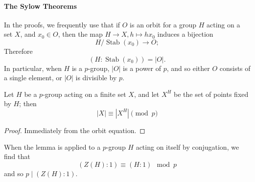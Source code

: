 \paragraph{The Sylow Theorems}

In the proofs, we frequently use that if \( O \) is an orbit for a group \( H \) acting on a set \( X \), and \( x_0 \in O \), then the map \( H \to X, h \mapsto h x_0 \) induces a bijection
\[
  H / \operatorname{Stab}(x_0) \to O;
\]
Therefore
\[
  (H: \operatorname{Stab}(x_0)) = \left\vert O \right\vert.
\]
In particular, when \( H \) is a \( p \)-group, \( \left\vert O \right\vert \) is a power of \( p \), and so either \( O \) consists of a single element, or \( \left\vert O \right\vert \) is divisible by \( p \).

\begin{lemma}
  Let \( H \) be a \( p \)-group acting on a finite set \( X \), and let \( X^H \) be the set of points fixed by \( H \);
  then
  \[
    \left\vert X \right\vert \equiv \left\vert X^H \right\vert \pmod{p}
  \]
\end{lemma}
\begin{proof}
  Immediately from the orbit equation.
\end{proof}
\begin{remark}
  When the lemma is applied to a \( p \)-group \( H \) acting on itself by conjugation, we find that
  \[
    (Z(H) : 1) \equiv (H : 1) \mod{p}
  \]
  and so \( p \mid (Z(H): 1) \).
\end{remark}


